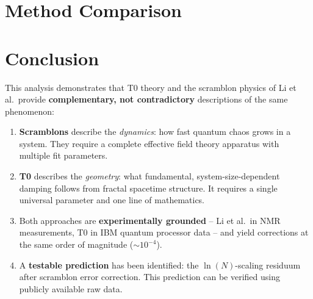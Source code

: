 \section{Method Comparison}
\label{sec:methods}

\begin{table}[h]
	\centering
	\caption{Systematic comparison: Scramblon theory vs.\ T0 projection}
	\label{tab:method_comparison}
\end{table}


\section{Conclusion}
\label{sec:conclusion}

This analysis demonstrates that T0 theory and the scramblon physics of Li et al.\ provide \textbf{complementary, not contradictory} descriptions of the same phenomenon:

\begin{enumerate}
	\item \textbf{Scramblons} describe the \emph{dynamics}: how fast quantum chaos grows in a system. They require a complete effective field theory apparatus with multiple fit parameters.
	
	\item \textbf{T0} describes the \emph{geometry}: what fundamental, system-size-dependent damping follows from fractal spacetime structure. It requires a single universal parameter and one line of mathematics.
	
	\item Both approaches are \textbf{experimentally grounded} -- Li et al.\ in NMR measurements, T0 in IBM quantum processor data -- and yield corrections at the same order of magnitude ($\sim 10^{-4}$).
	
	\item A \textbf{testable prediction} has been identified: the $\ln(N)$-scaling residuum after scramblon error correction. This prediction can be verified using publicly available raw data.
\end{enumerate}

